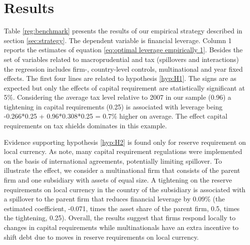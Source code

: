 \documentclass[12pt]{article}
\begin{document}
	\section{Results} \label{sec:result}
	 Table \ref{reg:benchmark} presents the results of our empirical strategy described in section \ref{sec:strategy}. The dependent variable is financial leverage. Column 1 reports the estimates of equation \ref{eq:optimal leverage empirically 1}. Besides the set of variables related to macroprudential and tax (spillovers and interactions) the regression includes firm-, country-level controls, multinational and year fixed effects. The first four lines are related to hypothesis \ref{hyp:H1}. The signs are as expected but only the effects of capital requirement are statistically significant at 5\%. Considering the average tax level relative to 2007 in our sample (0.96) a tightening in capital requirements (0.25) is associated with leverage being -0.266*0.25 + 0.96*0.308*0.25 = 0.7\% higher on average. The effect capital requirements on tax shields dominates in this example.   
	 
	 	\begin{small}
	 	{
	 		
	 	}
	 \end{small}
 
	Evidence supporting hypothesis \ref{hyp:H2} is found only for reserve requirement on local currency. As \cite{buch2017cross} note, many capital requirement regulations were implemented on the basis of international agreements, potentially limiting spillover. To illustrate the effect, we consider a multinational firm that consists of the parent firm and one subsidiary with assets of equal size. A tightening on the reserve requirements on local currency in the country of the subsidiary is associated with a spillover to the parent firm that reduces financial leverage by 0.09\% (the estimated coefficient, -0.071, times the  asset share of the parent firm, 0.5, times the tightening, 0.25). Overall, the results suggest that firms respond locally to changes in capital requirements while multinationals have an extra incentive to shift debt due to moves in reserve requirements on local currency.
	 
\end{document}
